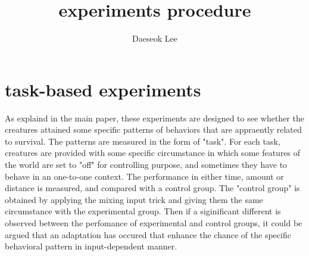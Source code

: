 \documentclass{amsart}
\theoremstyle{definition}
\theoremstyle{remark}
\numberwithin{equation}{section}
\begin{document}
\title{experiments procedure}
\author{Daeseok Lee}
\maketitle
\section{task-based experiments}
As explaind in the main paper, these experiments are designed to see whether the creatures attained some specific patterns of behaviors that are appraently related to survival. The patterns are measured in the form of "task". For each task, creatures are provided with some specific circumstance in which some features of the world are set to "off" for controlling purpose, and sometimes they have to behave in an one-to-one context. The performance in either time, amount or distance is measured, and compared with a control group. The "control group" is obtained by applying the mixing input trick and giving them the same circumstance with the experimental group. Then if a siginificant different is observed between the perfomance of experimental and control groups, it could be argued that an adaptation has occured that enhance the chance of the specific behavioral pattern in input-dependent manner.
\end{document}
